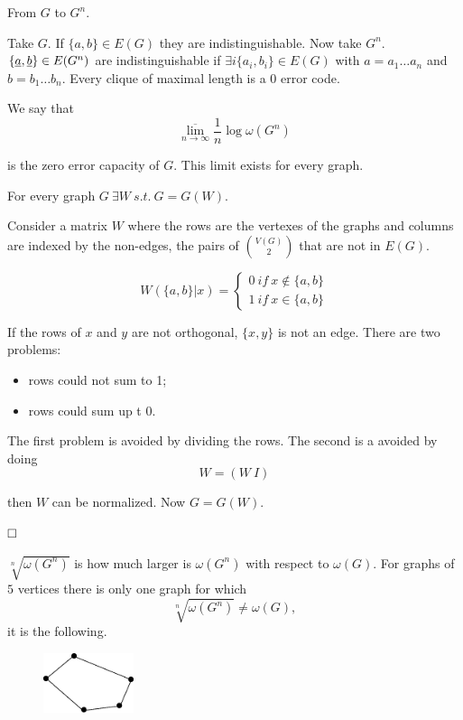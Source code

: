 \noindent From $G$ to $G^n$.

\noindent Take $G$. If $\{a, b\} \in E(G)$ they are indistinguishable. Now take $G^n$. $\{\underline{a}, \underline{b}\} \in E(G^n)$ are indistinguishable if $\exists i \{a_i, b_i\} \in E(G)$ with $a = a_1\ldots a_n$ and $b=b_1\ldots b_n$. Every clique of maximal length is a 0 error code.

We say that 
\[
\overline{\lim_{n \rightarrow \infty}}\dfrac{1}{n}\log \omega(G^n)
\]

is the zero error capacity of $G$. This limit exists for every graph.

\begin{prop}
	For every graph $G\ \exists W\ s.t.\ G = G(W)$.
\end{prop}

Consider a matrix $W$ where the rows are the vertexes of the graphs and columns are indexed by the non-edges, \ie the pairs of $\binom{V(G)}{2}$ that are not in $E(G)$.

\begin{equation}
	W(\{a,b\}|x) = \begin{cases}
	0\ if\ x\not\in \{a, b\}\\
	1\ if\ x\in \{a, b\}
	\end{cases}
\end{equation}

If the rows of $x$ and $y$ are not orthogonal, $\{x, y\}$ is not an edge. There are two problems:
\begin{itemize}
	\item rows could not sum to 1;
	\item rows could sum up t 0.
\end{itemize}

The first problem is avoided by dividing the rows. The second is a avoided by doing
\[
W = (W\ I)
\]

then $W$ can be normalized. Now $G = G(W)$.

$\hfill\Box$

$ \sqrt[n]{\omega(G^n)}$ is how much larger is $\omega(G^n)$ with respect to $\omega(G)$. For graphs of $5$ vertices there is only one graph for which
\[
 \sqrt[n]{\omega(G^n)} \not=\omega(G),
\]
it is the following.
\begin{figure}[h!]
	\centering
	\includegraphics[width=100px]{pictures/graph5v.eps}
\end{figure}

